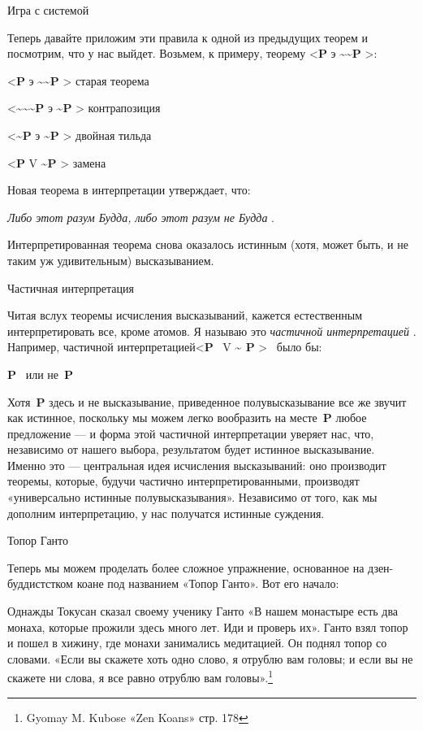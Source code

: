 Игра с системой

Теперь давайте приложим эти правила к одной из предыдущих теорем и посмотрим, что у нас выйдет. Возьмем, к примеру, теорему \textless{}\textbf{P} э \textbf{\textasciitilde\textasciitilde P} \textgreater:

\textless{}\textbf{P} э \textbf{\textasciitilde\textasciitilde P} \textgreater{} старая теорема

\textless{}\textbf{\textasciitilde\textasciitilde\textasciitilde P} э \textbf{\textasciitilde P} \textgreater{} контрапозиция

\textless{}\textbf{\textasciitilde P} э \textbf{\textasciitilde P} \textgreater{} двойная тильда

\textless{}\textbf{P} V \textbf{\textasciitilde P} \textgreater{} замена

Новая теорема в интерпретации утверждает, что:

\emph{Либо этот разум Будда, либо этот разум не Будда} .

Интерпретированная теорема снова оказалось истинным (хотя, может быть, и не таким уж удивительным) высказыванием.

Частичная интерпретация

Читая вслух теоремы исчисления высказываний, кажется естественным интерпретировать все, кроме атомов. Я называю это \emph{частичной интерпретацией} . Например, частичной интерпретацией\textless{}\textbf{P} ~V \textbf{\textasciitilde{} P} \textgreater~ было бы:

\textbf{P} ~или не~\textbf{P}

Хотя~\textbf{P} здесь и не высказывание, приведенное полувысказывание все же звучит как истинное, поскольку мы можем легко вообразить на месте~\textbf{P} любое предложение --- и форма этой частичной интерпретации уверяет нас, что, независимо от нашего выбора, результатом будет истинное высказывание. Именно это --- центральная идея исчисления высказываний: оно производит теоремы, которые, будучи частично интерпретированными, производят «универсально истинные полувысказывания». Независимо от того, как мы дополним интерпретацию, у нас получатся истинные суждения.

Топор Ганто

Теперь мы можем проделать более сложное упражнение, основанное на дзен-буддистстком коане под названием «Топор Ганто». Вот его начало:

Однажды Токусан сказал своему ученику Ганто «В нашем монастыре есть два монаха, которые прожили здесь много лет. Иди и проверь их». Ганто взял топор и пошел в хижину, где монахи занимались медитацией. Он поднял топор со словами. «Если вы скажете хоть одно слово, я отрублю вам головы; и если вы не скажете ни слова, я все равно отрублю вам головы».\footnote{Gyomay M. Kubose «Zen Koans» стр. 178}

